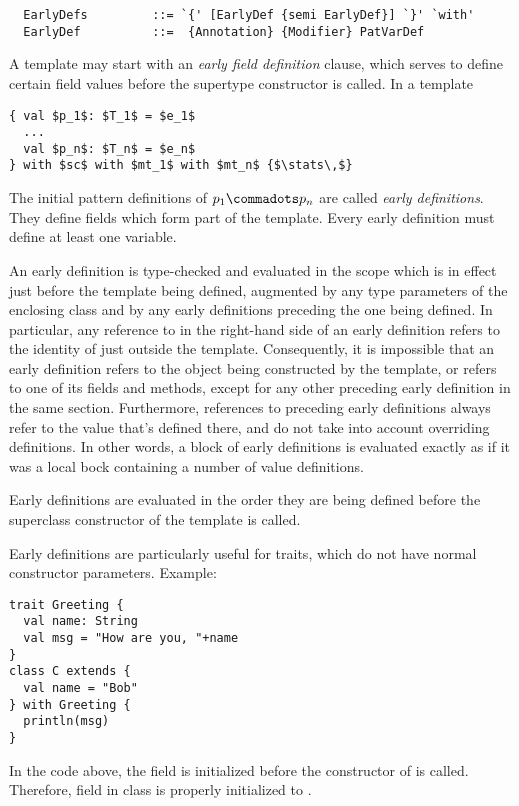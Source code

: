 \syntax\begin{lstlisting}
  EarlyDefs         ::= `{' [EarlyDef {semi EarlyDef}] `}' `with'
  EarlyDef          ::=  {Annotation} {Modifier} PatVarDef
\end{lstlisting}

A template may start with an {\em early field definition} clause,
which serves to define certain field values before the supertype
constructor is called. In a template
\begin{lstlisting}
{ val $p_1$: $T_1$ = $e_1$
  ...
  val $p_n$: $T_n$ = $e_n$
} with $sc$ with $mt_1$ with $mt_n$ {$\stats\,$}
\end{lstlisting}
The initial pattern definitions of $p_1 \commadots p_n$ are called
{\em early definitions}. They define fields 
which form part of the template. Every early definition must define
at least one variable. 

An early definition is type-checked and evaluated in the scope which
is in effect just before the template being defined, augmented by any
type parameters of the enclosing class and by any early definitions
preceding the one being defined. In particular, any reference to
\lstinline@this@ in the right-hand side of an early definition refers
to the identity of \lstinline@this@ just outside the template. Consequently, it
is impossible that an early definition refers to the object being
constructed by the template, or refers to one of its fields and
methods, except for any other preceding early definition in the same
section. Furthermore, references to preceding early definitions
always refer to the value that's defined there, and do not take into account
overriding definitions. In other words, a block of early definitions
is evaluated exactly as if it was a local bock containing a number of value
definitions.
 

Early definitions are evaluated in the order they are being defined
before the superclass constructor of the template is called.

\example Early definitions are particularly useful for
traits, which do not have normal constructor parameters. Example:
\begin{lstlisting}
trait Greeting {
  val name: String
  val msg = "How are you, "+name
}
class C extends {
  val name = "Bob"
} with Greeting {
  println(msg)
}
\end{lstlisting}
In the code above, the field  is initialized before the
constructor of  is called. Therefore, field \lstinline@msg@ in
class  is properly initialized to .

